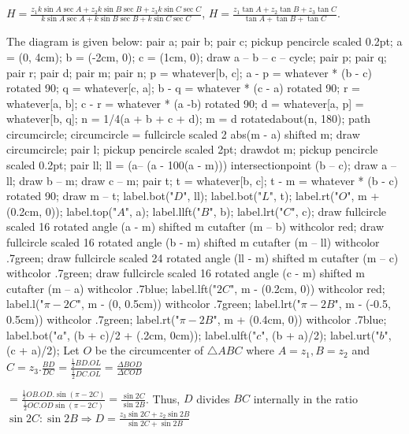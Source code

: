   $H = \frac{z_1k\sin A\sec A + z_2k\sin B\sec B + z_3k\sin C\sec C}{k\sin A\sec A + k\sin B\sec B + k\sin C\sec C}$,
  $H = \frac{z_1\tan A + z_2\tan B + z_3\tan C}{\tan A + \tan B + \tan C}$.
\item The diagram is given below:
  \startplacefigure[location={left, none}]
    \startMPcode
      pair a; pair b; pair c;
      pickup pencircle scaled 0.2pt;
      a = (0, 4cm); b = (-2cm, 0); c = (1cm, 0);
      draw a -- b -- c -- cycle;
      pair p; pair q; pair r; pair d; pair m; pair n;
      p = whatever[b, c]; a - p = whatever * (b - c) rotated 90;
      q = whatever[c, a]; b - q = whatever * (c - a) rotated 90;
      r = whatever[a, b]; c - r = whatever * (a -b) rotated 90;
      d = whatever[a, p] = whatever[b, q]; %
      n = 1/4(a + b + c + d); %
      m = d rotatedabout(n, 180); %
      path circumcircle;
      circumcircle = fullcircle scaled 2 abs(m - a) shifted m;
      draw circumcircle;
      pair l;
      pickup pencircle scaled 2pt;
      drawdot m;
      pickup pencircle scaled 0.2pt;
      pair ll;
      ll = (a-- (a - 100(a - m))) intersectionpoint (b -- c);
      draw a -- ll;
      draw b -- m;
      draw c -- m;
      pair t;
      t = whatever[b, c];
      t - m = whatever * (b - c) rotated 90; %
      draw m -- t;
      label.bot("$D$", ll);
      label.bot("$L$", t);
      label.rt("$O$", m + (0.2cm, 0));
      label.top("$A$", a);
      label.llft("$B$", b);
      label.lrt("$C$", c);
      draw fullcircle scaled 16 rotated angle (a - m) shifted m cutafter (m -- b) withcolor red; %
      draw fullcircle scaled 16 rotated angle (b - m) shifted m cutafter (m -- ll) withcolor .7green;
      draw fullcircle scaled 24 rotated angle (ll - m) shifted m cutafter (m -- c) withcolor .7green;
      draw fullcircle scaled 16 rotated angle (c - m) shifted m cutafter (m -- a) withcolor .7blue;
      label.lft("$2C$", m - (0.2cm, 0)) withcolor red;
      label.l("$\pi - 2C$", m - (0, 0.5cm)) withcolor .7green;
      label.lrt("$\pi - 2B$", m - (-0.5, 0.5cm)) withcolor .7green;
      label.rt("$\pi - 2B$", m + (0.4cm, 0)) withcolor .7blue;
      label.bot("$a$", (b + c)/2 + (.2cm, 0cm));
      label.ulft("$c$", (b + a)/2);
      label.urt("$b$", (c + a)/2);
    \stopMPcode
  \stopplacefigure
  Let $O$ be the circumcenter of $\triangle ABC$ where $A=z_1, B=z_2$ and $C=z_3. \frac{BD}{DC} =
  \frac{\frac{1}{2}BD.OL}{\frac{1}{2}DC.OL} = \frac{\Delta BOD}{\Delta COD}$

  $= \frac{\frac{1}{2}OB.OD.\sin(\pi - 2C)}{\frac{1}{2}OC.OD\sin(\pi - 2C)} = \frac{\sin2C}{\sin2B}$.  Thus,
  $D$ divides $BC$ internally in the ratio $\sin2C:\sin2B \Rightarrow D = \frac{z_3\sin2C +
    z_2\sin2B}{\sin2C + \sin2B}$

